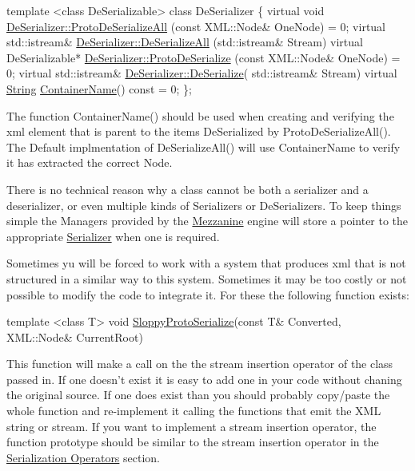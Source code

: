 \begin{DoxyCode}
\textcolor{keyword}{template} <\textcolor{keyword}{class} DeSerializable> \textcolor{keyword}{class }DeSerializer
\{
    \textcolor{keyword}{virtual} \textcolor{keywordtype}{void} \hyperlink{classMezzanine_1_1DeSerializer_a59b92952b1465392178d6db736118c26}{DeSerializer::ProtoDeSerializeAll}
      (\textcolor{keyword}{const} XML::Node& OneNode) = 0;
    \textcolor{keyword}{virtual} std::istream& \hyperlink{classMezzanine_1_1DeSerializer_ab2765b0fe8f803344c6965df50333073}{DeSerializer::DeSerializeAll}
      (std::istream& Stream)
    \textcolor{keyword}{virtual} DeSerializable* \hyperlink{classMezzanine_1_1DeSerializer_af1a7d10744ae974c985ad762e7dd55bd}{DeSerializer::ProtoDeSerialize}
      (\textcolor{keyword}{const} XML::Node& OneNode) = 0;
    \textcolor{keyword}{virtual} std::istream& \hyperlink{classMezzanine_1_1DeSerializer_aaf31c38d936ec89323c3cb9196a5a97f}{DeSerializer::DeSerialize}(
      std::istream& Stream)
    \textcolor{keyword}{virtual} \hyperlink{namespaceMezzanine_acf9fcc130e6ebf08e3d8491aebcf1c86}{String} \hyperlink{classMezzanine_1_1DeSerializer_a99e25b2dab4cde22af1c77fa31665bae}{ContainerName}() \textcolor{keyword}{const} = 0;
\};
\end{DoxyCode}
 The function Container\-Name() should be used when creating and verifying the xml element that is parent to the items De\-Serialized by Proto\-De\-Serialize\-All(). The Default implmentation of De\-Serialize\-All() will use Container\-Name to verify it has extracted the correct Node. \par
 \par
 There is no technical reason why a class cannot be both a serializer and a deserializer, or even multiple kinds of Serializers or De\-Serializers. To keep things simple the Managers provided by the \hyperlink{namespaceMezzanine}{Mezzanine} engine will store a pointer to the appropriate \hyperlink{classMezzanine_1_1Serializer}{Serializer} when one is required. 

Sometimes yu will be forced to work with a system that produces xml that is not structured in a similar way to this system. Sometimes it may be too costly or not possible to modify the code to integrate it. For these the following function exists\-: 
\begin{DoxyCode}
\textcolor{keyword}{template} <\textcolor{keyword}{class} T> \textcolor{keywordtype}{void} \hyperlink{namespaceMezzanine_a519df380398999cb532245118b9cb6a2}{SloppyProtoSerialize}(\textcolor{keyword}{const} T& 
      Converted, XML::Node& CurrentRoot)
\end{DoxyCode}
 This function will make a call on the the stream insertion operator of the class passed in. If one doesn't exist it is easy to add one in your code without chaning the original source. If one does exist than you should probably copy/paste the whole function and re-\/implement it calling the functions that emit the X\-M\-L string or stream. If you want to implement a stream insertion operator, the function prototype should be similar to the stream insertion operator in the \hyperlink{Serialization_serializationoperators}{Serialization Operators} section. 

